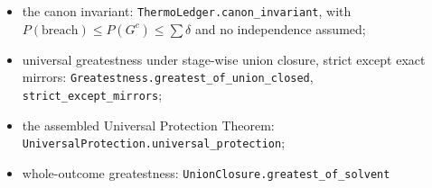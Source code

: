 \documentclass[
]{article}
\providecommand{\tightlist}{%
  \setlength{\itemsep}{0pt}\setlength{\parskip}{0pt}}
\begin{document}
\begin{itemize}
\tightlist
\item
  the canon invariant:
  \texttt{T\allowbreak{}h\allowbreak{}e\allowbreak{}r\allowbreak{}m\allowbreak{}o\allowbreak{}L\allowbreak{}e\allowbreak{}d\allowbreak{}g\allowbreak{}e\allowbreak{}r\allowbreak{}.\allowbreak{}c\allowbreak{}a\allowbreak{}n\allowbreak{}o\allowbreak{}n\allowbreak{}\_\allowbreak{}i\allowbreak{}n\allowbreak{}v\allowbreak{}a\allowbreak{}r\allowbreak{}i\allowbreak{}a\allowbreak{}n\allowbreak{}t},
  with \(P(\text{breach})\le P(G^c)\le\sum\delta\) and no independence
  assumed;
\item
  universal greatestness under stage-wise union closure, strict except
  exact mirrors:
  \texttt{G\allowbreak{}r\allowbreak{}e\allowbreak{}a\allowbreak{}t\allowbreak{}e\allowbreak{}s\allowbreak{}t\allowbreak{}n\allowbreak{}e\allowbreak{}s\allowbreak{}s\allowbreak{}.\allowbreak{}g\allowbreak{}r\allowbreak{}e\allowbreak{}a\allowbreak{}t\allowbreak{}e\allowbreak{}s\allowbreak{}t\allowbreak{}\_\allowbreak{}o\allowbreak{}f\allowbreak{}\_\allowbreak{}u\allowbreak{}n\allowbreak{}i\allowbreak{}o\allowbreak{}n\allowbreak{}\_\allowbreak{}c\allowbreak{}l\allowbreak{}o\allowbreak{}s\allowbreak{}e\allowbreak{}d},
  \texttt{s\allowbreak{}t\allowbreak{}r\allowbreak{}i\allowbreak{}c\allowbreak{}t\allowbreak{}\_\allowbreak{}e\allowbreak{}x\allowbreak{}c\allowbreak{}e\allowbreak{}p\allowbreak{}t\allowbreak{}\_\allowbreak{}m\allowbreak{}i\allowbreak{}r\allowbreak{}r\allowbreak{}o\allowbreak{}r\allowbreak{}s};
\item
  the assembled Universal Protection Theorem:
  \texttt{U\allowbreak{}n\allowbreak{}i\allowbreak{}v\allowbreak{}e\allowbreak{}r\allowbreak{}s\allowbreak{}a\allowbreak{}l\allowbreak{}P\allowbreak{}r\allowbreak{}o\allowbreak{}t\allowbreak{}e\allowbreak{}c\allowbreak{}t\allowbreak{}i\allowbreak{}o\allowbreak{}n\allowbreak{}.\allowbreak{}u\allowbreak{}n\allowbreak{}i\allowbreak{}v\allowbreak{}e\allowbreak{}r\allowbreak{}s\allowbreak{}a\allowbreak{}l\allowbreak{}\_\allowbreak{}p\allowbreak{}r\allowbreak{}o\allowbreak{}t\allowbreak{}e\allowbreak{}c\allowbreak{}t\allowbreak{}i\allowbreak{}o\allowbreak{}n};
\item
  whole-outcome greatestness:
  \texttt{U\allowbreak{}n\allowbreak{}i\allowbreak{}o\allowbreak{}n\allowbreak{}C\allowbreak{}l\allowbreak{}o\allowbreak{}s\allowbreak{}u\allowbreak{}r\allowbreak{}e\allowbreak{}.\allowbreak{}g\allowbreak{}r\allowbreak{}e\allowbreak{}a\allowbreak{}t\allowbreak{}e\allowbreak{}s\allowbreak{}t\allowbreak{}\_\allowbreak{}o\allowbreak{}f\allowbreak{}\_\allowbreak{}s\allowbreak{}o\allowbreak{}l\allowbreak{}v\allowbreak{}e\allowbreak{}n\allowbreak{}t}

\end{itemize}
\end{document}
